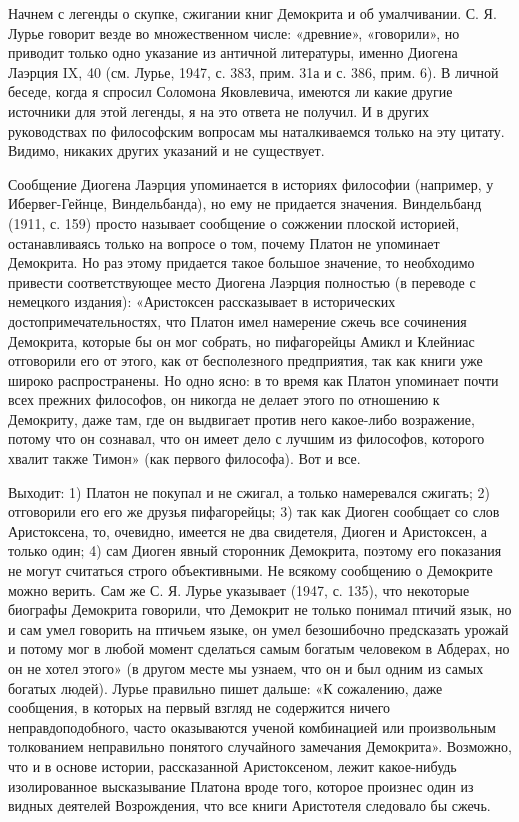 Начнем с легенды  о скупке, сжигании книг Демокрита  и об умалчивании.
С.  Я.   Лурье  говорит  везде  во   множественном  числе:  «древние»,
«говорили», но  приводит только одно указание  из античной литературы,
именно Диогена Лаэрция IX, 40 (см. Лурье, 1947, с. 383, прим. 31а и с.
386, прим. 6).  В личной беседе, когда я  спросил Соломона Яковлевича,
имеются ли  какие другие источники для  этой легенды, я на  это ответа
не  получил.  И  в  других руководствах  по  философским  вопросам  мы
наталкиваемся только на эту цитату.  Видимо, никаких других указаний и
не существует.

Сообщение Диогена Лаэрция упоминается  в историях философии (например,
у  Ибервег-Гейнце,  Виндельбанда),  но   ему  не  придается  значения.
Виндельбанд  (1911,  с.  159)  просто называет  сообщение  о  сожжении
плоской  историей,  останавливаясь только  на  вопросе  о том,  почему
Платон не  упоминает Демокрита. Но  раз этому придается  такое большое
значение, то необходимо привести соответствующее место Диогена Лаэрция
полностью (в переводе с немецкого издания): «Аристоксен рассказывает в
исторических достопримечательностях,  что Платон имел  намерение сжечь
все сочинения  Демокрита, которые  бы он  мог собрать,  но пифагорейцы
Амикл  и  Клейниас  отговорили  его  от  этого,  как  от  бесполезного
предприятия, так как книги уже  широко распространены. Но одно ясно: в
то время как Платон упоминает почти всех прежних философов, он никогда
не делает этого  по отношению к Демокриту, даже там,  где он выдвигает
против  него какое-либо  возражение, потому  что он  сознавал, что  он
имеет дело  с лучшим из  философов, которого хвалит также  Тимон» (как
первого философа). Вот и все.

Выходит:  1) Платон  не  покупал  и не  сжигал,  а только  намеревался
сжигать;  2) отговорили  его его  же  друзья пифагорейцы;  3) так  как
Диоген  сообщает со  слов Аристоксена,  то, очевидно,  имеется не  два
свидетеля, Диоген  и Аристоксен,  а только один;  4) сам  Диоген явный
сторонник Демокрита,  поэтому его показания не  могут считаться строго
объективными. Не всякому сообщению о Демокрите можно верить. Сам же С.
Я. Лурье  указывает (1947, с.  135), что некоторые  биографы Демокрита
говорили, что  Демокрит не только понимал  птичий язык, но и  сам умел
говорить на  птичьем языке, он  умел безошибочно предсказать  урожай и
потому мог в любой момент сделаться самым богатым человеком в Абдерах,
но  он не  хотел  этого» (в  другом  месте  мы узнаем,  что  он и  был
одним  из  самых богатых  людей).  Лурье  правильно пишет  дальше:  «К
сожалению, даже  сообщения, в которых  на первый взгляд  не содержится
ничего  неправдоподобного, часто  оказываются  ученой комбинацией  или
произвольным  толкованием  неправильно понятого  случайного  замечания
Демокрита».   Возможно,  что   и   в   основе  истории,   рассказанной
Аристоксеном,  лежит какое-нибудь  изолированное высказывание  Платона
вроде того, которое произнес один  из видных деятелей Возрождения, что
все книги Аристотеля следовало бы сжечь.

